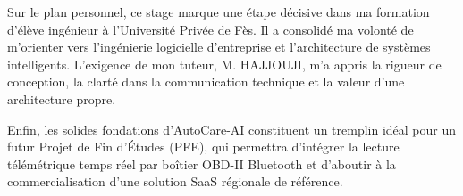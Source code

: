\documentclass[12pt,a4paper,oneside]{report}
\begin{document}
Sur le plan personnel, ce stage marque une \'etape d\'ecisive dans ma formation d'\'elève ing\'enieur \`a l'Universit\'e Priv\'ee de F\`es. Il a consolid\'e ma volont\'e de m'orienter vers l'ing\'enierie logicielle d'entreprise et l'architecture de syst\`emes intelligents. L'exigence de mon tuteur, M. HAJJOUJI, m'a appris la rigueur de conception, la clart\'e dans la communication technique et la valeur d'une architecture propre.

Enfin, les solides fondations d'AutoCare-AI constituent un tremplin id\'eal pour un futur Projet de Fin d'\'Etudes (PFE), qui permettra d'int\'egrer la lecture t\'el\'em\'etrique temps r\'eel par bo\^itier OBD-II Bluetooth et d'aboutir \`a la commercialisation d'une solution SaaS r\'egionale de r\'ef\'erence.

\clearpage
\end{document}
